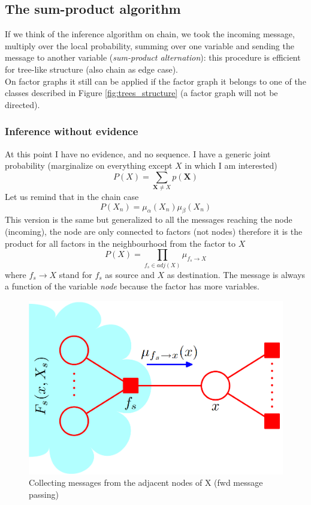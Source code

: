     \subsection{The sum-product algorithm}
        If we think of the inference algorithm on chain, we took the incoming message, multiply over the local probability, summing over one variable and sending the message to another variable (\textit{sum-product alternation}): this procedure is efficient for tree-like structure (also chain as edge case).\\
        On factor graphs it still can be applied if the factor graph it belongs to one of the classes described in Figure \ref{fig:trees_structure} (a factor graph will not be directed).
        
        \subsubsection{Inference without evidence}
            At this point I have no evidence, and no sequence. I have a generic joint probability (marginalize on everything except $X$ in which I am interested)
            $$P(X) = \sum_{\textbf{X} \neq X} p(\textbf{X})$$
            Let us remind that in the chain case
            $$P(X_n) = \mu_\alpha (X_n) \mu_\beta(X_n)$$
            This version is the same but generalized to all the messages reaching the node (incoming), the node are only connected to factors (not nodes) therefore it is the product for all factors in the neighbourhood from the factor to $X$
            $$P(X) = \prod _{f_s \in adj(X)} \mu_{f_s \rightarrow X}$$
            where $f_s \rightarrow X$ stand for $f_s$ as source and $X$ as destination. The message is always a function of the variable \textit{node} because the factor has more variables.
            \begin{figure}[ht]
                \centering
                \includegraphics[scale=0.3]{images/message_BN_fwd.png}
                \caption{Collecting messages from the adjacent nodes of X (fwd message passing)}
                \label{fig:message_BN_fwd}
            \end{figure}
